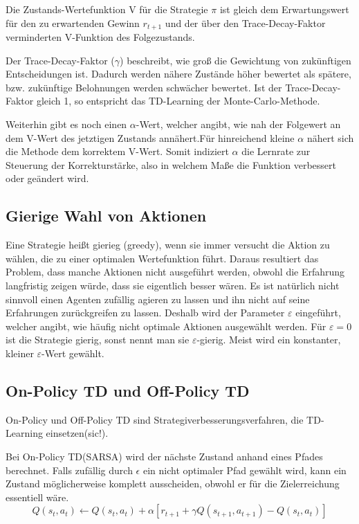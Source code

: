 \documentclass[10pt]{scrartcl}
\begin{document}
Die Zustands-Wertefunktion V für die Strategie $\pi$ ist gleich dem Erwartungswert für den zu erwartenden Gewinn $r_{t+1}$ und der über den Trace-Decay-Faktor verminderten V-Funktion des Folgezustands.

Der Trace-Decay-Faktor ($\gamma$) beschreibt, wie groß die Gewichtung von zukünftigen Entscheidungen ist. Dadurch werden nähere Zustände höher bewertet als spätere, bzw. zukünftige Belohnungen werden schwächer bewertet. Ist der Trace-Decay-Faktor  gleich 1, so entspricht das TD-Learning der Monte-Carlo-Methode.

Weiterhin gibt es noch einen $\alpha$-Wert, welcher angibt, wie nah der Folgewert an dem V-Wert des jetztigen Zustands annähert.Für hinreichend kleine $\alpha$ nähert sich die Methode dem korrektem V-Wert. Somit indiziert $\alpha$ die Lernrate zur Steuerung der Korrekturstärke, also in welchem Maße die Funktion verbessert oder geändert wird.

\subsection{Gierige Wahl von Aktionen}
Eine Strategie heißt gierieg (greedy), wenn sie immer versucht die Aktion zu wählen, die zu einer optimalen Wertefunktion führt. Daraus resultiert das Problem, dass manche Aktionen nicht ausgeführt werden, obwohl die Erfahrung langfristig zeigen würde, dass sie eigentlich besser wären. 
Es ist natürlich nicht sinnvoll einen Agenten zufällig agieren zu lassen und ihn nicht auf seine Erfahrungen zurückgreifen zu lassen. Deshalb wird der Parameter $\varepsilon$ eingeführt, welcher angibt, wie häufig nicht optimale Aktionen ausgewählt werden. Für $\varepsilon = 0$ ist die Strategie gierig, sonst nennt man sie $\varepsilon$-gierig. Meist wird ein konstanter, kleiner $\varepsilon$-Wert gewählt. 

\subsection{On-Policy TD und Off-Policy TD}
On-Policy und Off-Policy TD sind Strategiverbesserungsverfahren, die TD-Learning einsetzen(sic!).

Bei On-Policy TD(SARSA) wird der nächste Zustand anhand eines Pfades berechnet. Falls zufällig durch $\epsilon$ ein nicht optimaler Pfad gewählt wird, kann ein Zustand möglicherweise komplett ausscheiden, obwohl er für die Zielerreichung essentiell wäre. 
\begin{equation}
Q(s_t,a_t) \leftarrow Q(s_t,a_t) + \alpha[r_{t+1}+\gamma Q(s_{t+1},a_{t+1})- Q(s_t,a_t)]
\end{equation}
\end{document}
